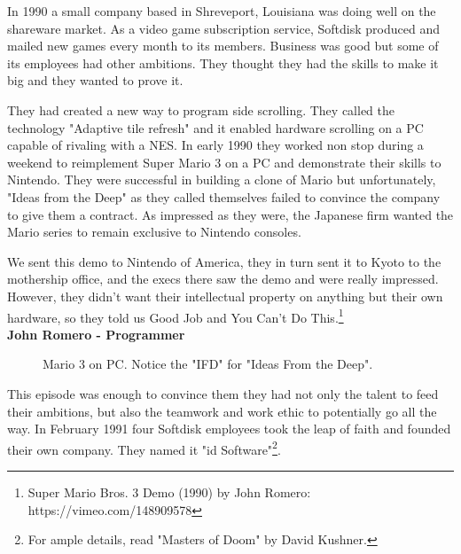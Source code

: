 \documentclass[book.tex]{subfiles}
\begin{document}
In 1990 a small company based in Shreveport, Louisiana was doing well on the shareware market. As a video game subscription service, Softdisk produced and mailed new games every month to its members. Business was good but some of its employees had other ambitions. They thought they had the skills to make it big and they wanted to prove it.\\
\par
They had created a new way to program side scrolling. They called the technology "Adaptive tile refresh" and it enabled hardware scrolling on a PC capable of rivaling with a NES. In early 1990 they worked non stop during a weekend to reimplement Super Mario 3 on a PC and demonstrate their skills to Nintendo. They were successful in building a clone of Mario but unfortunately, "Ideas from the Deep" as they called themselves failed to convince the company to give them a contract. As impressed as they were, the Japanese firm wanted the Mario series to remain exclusive to Nintendo consoles.\\
\par
\begin{fancyquotes}
We sent this demo to Nintendo of America, they in turn sent it to Kyoto to the mothership office, and the execs there saw the demo and were really impressed. However, they didn't want their intellectual property on anything but their own hardware, so they told us Good Job and You Can't Do This.\footnote{Super Mario Bros. 3 Demo (1990) by John Romero: https://vimeo.com/148909578}
 \bigskip \\
\textbf{John Romero - Programmer}
 \end{fancyquotes}

 \begin{figure}[H]
\caption{Mario 3 on PC. Notice the "IFD" for "Ideas From the Deep".}
\end{figure}

\par
This episode was enough to convince them they had not only the talent to feed their ambitions, but also the teamwork and work ethic to potentially go all the way. In February 1991 four Softdisk employees took the leap of faith and founded their own company. They named it "id Software"\footnote{For ample details, read "Masters of Doom" by David Kushner.}. 
\end{document}
